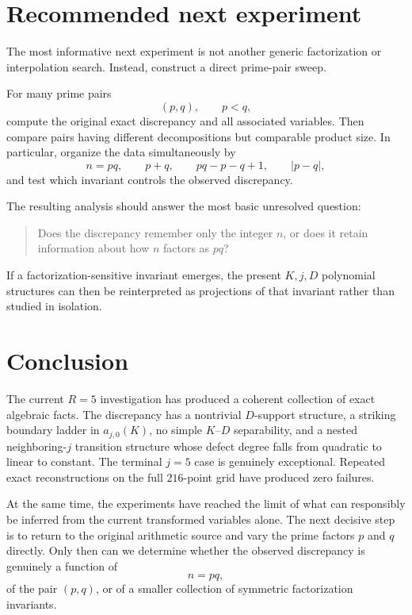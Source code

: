 \documentclass[11pt,a4paper]{article}
\begin{document}
\section{Recommended next experiment}

The most informative next experiment is not another generic factorization or interpolation search. Instead, construct a direct prime-pair sweep.

For many prime pairs
\[
(p,q),
\qquad p<q,
\]
compute the original exact discrepancy and all associated variables. Then compare pairs having different decompositions but comparable product size. In particular, organize the data simultaneously by
\[
n=pq,
\qquad p+q,
\qquad pq-p-q+1,
\qquad |p-q|,
\]
and test which invariant controls the observed discrepancy.

The resulting analysis should answer the most basic unresolved question:
\begin{quote}
Does the discrepancy remember only the integer $n$, or does it retain information about how $n$ factors as $pq$?
\end{quote}

If a factorization-sensitive invariant emerges, the present $K,j,D$ polynomial structures can then be reinterpreted as projections of that invariant rather than studied in isolation.

\section{Conclusion}

The current $R=5$ investigation has produced a coherent collection of exact algebraic facts.
The discrepancy has a nontrivial $D$-support structure, a striking boundary ladder in $a_{j,0}(K)$, no simple $K$--$D$ separability, and a nested neighboring-$j$ transition structure whose defect degree falls from quadratic to linear to constant.
The terminal $j=5$ case is genuinely exceptional.
Repeated exact reconstructions on the full $216$-point grid have produced zero failures.

At the same time, the experiments have reached the limit of what can responsibly be inferred from the current transformed variables alone.
The next decisive step is to return to the original arithmetic source and vary the prime factors $p$ and $q$ directly.
Only then can we determine whether the observed discrepancy is genuinely a function of
\[
n=pq,
\]
of the pair $(p,q)$, or of a smaller collection of symmetric factorization invariants.
\end{document}
